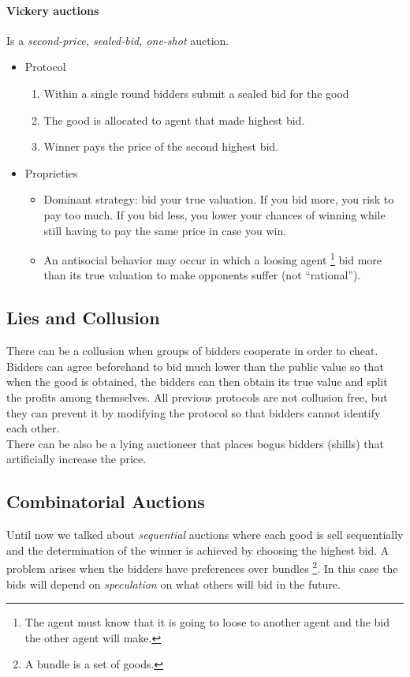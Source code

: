 \documentclass[10pt,a4paper]{article}
\begin{document}
\paragraph{Vickery auctions}
Is a \textit{second-price, sealed-bid, one-shot} auction. 

\begin{itemize}
\item Protocol
\begin{enumerate}
\item Within a single round bidders submit a sealed bid for the good
\item  The good is allocated to agent that made highest bid.
\item  Winner pays the price of the second highest bid.
\end{enumerate}

\item Proprieties
\begin{itemize}
\item Dominant strategy: bid your true valuation. If you bid more, you risk to pay too much. If you bid less, you lower your chances of winning while still having to pay the same price in case you win.
\item An antisocial behavior may occur in which a loosing agent \footnote{The agent must know that it is going to loose to another agent and the bid the other agent will make.} bid more than its true valuation to make opponents suffer (not “rational”).

\end{itemize}
\end{itemize}

\subsection{Lies and Collusion}
 
 There can be a collusion when groups of bidders cooperate in order to cheat. Bidders can agree beforehand to bid much lower than the public value so that when the good is obtained, the bidders can then obtain its true value and split the profits among themselves. All previous protocols are not collusion free, but they can prevent it by modifying the protocol so that bidders cannot identify each other.\\
There can be also be a lying auctioneer that places bogus bidders (shills) that artificially increase the price.

\subsection{Combinatorial Auctions}
Until now we talked about \textit{sequential} auctions where each good is sell sequentially and the determination of the winner is achieved by choosing the highest bid. A problem arises when the bidders have preferences over bundles \footnote{A bundle is a set of goods.}. In this case the bids will depend on \textit{speculation} on what others will bid in the future.\\
\end{document}
